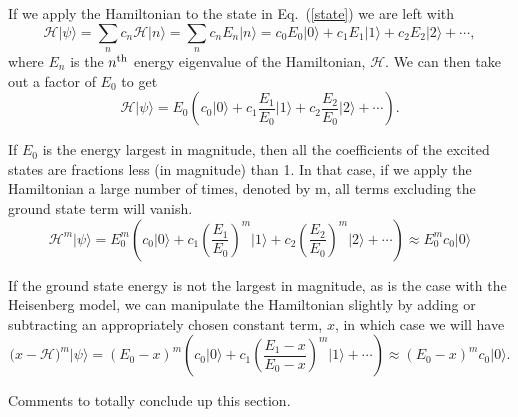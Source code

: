 If we apply the Hamiltonian to the state in Eq.~(\ref{state}) we are left with
\begin{equation}
\mathcal{H}\lvert \psi \rangle = \sum_n c_n \mathcal{H} \lvert n \rangle =
 		\sum_n c_n E_n \lvert n \rangle = 
		c_0 E_0 \lvert 0 \rangle + c_1 E_1 \lvert 1 \rangle +
		c_2 E_2 \lvert 2 \rangle + \cdots,
\end{equation}
where $E_n$ is the $n^{\rm{th}}$ energy eigenvalue of the Hamiltonian, $\mathcal{H}$.
We can then take out a factor of $E_0$ to get
\begin{equation}
\mathcal{H}\lvert \psi \rangle =
		E_0 \left(c_0 \lvert 0 \rangle + c_1 \frac{E_1}{E_0} \lvert 1 \rangle +
		c_2\frac{ E_2}{E_0} \lvert 2 \rangle + \cdots \right).
\end{equation}

If $E_0$ is the energy largest in magnitude, then all the coefficients
of the excited states are fractions less (in magnitude) than 1.  
In that case, if we apply the Hamiltonian a large number of times, denoted by m, all terms excluding
the ground state term will vanish.
\begin{equation}
\mathcal{H}^m\lvert \psi \rangle =
		E_0^m \left(c_0 \lvert 0 \rangle + 
		c_1 \left(\frac{E_1}{E_0}\right)^m \lvert 1 \rangle +
		c_2\left(\frac{ E_2}{E_0}\right)^m \lvert 2 \rangle + \cdots \right)
		\approx E_0^m c_0 \lvert 0 \rangle
\end{equation}

If the ground state energy is not the largest in magnitude, as is the case with the Heisenberg
model, we can manipulate the Hamiltonian slightly by adding or subtracting an
appropriately chosen constant term, $x$, in which case we will have
\begin{equation}
(x-\mathcal{H)}^m\lvert \psi \rangle =
		(E_0-x)^m \left(c_0 \lvert 0 \rangle + 
		c_1 \left(\frac{E_1-x}{E_0-x}\right)^m \lvert 1 \rangle  + \cdots \right)
		\approx (E_0-x)^m c_0 \lvert 0 \rangle.
\end{equation}

{\color{red} Comments to totally conclude up this section.}


